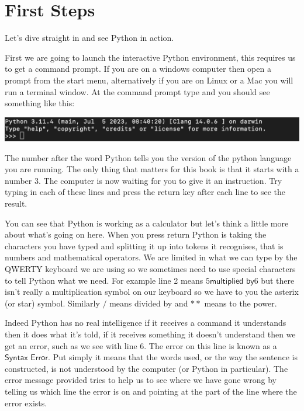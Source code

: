 \section{First Steps} \label{sec:FirstSteps}

Let's dive straight in and see Python in action. 

First we are going to launch the interactive Python environment, this requires us to get a command prompt. If you are on a windows computer then open a prompt from the start menu, alternatively if you are on Linux or a Mac you will run a terminal window. At the command prompt type  and you should see something like this:

\begin{center}
    \includegraphics[width=1\linewidth]{images/screenshots/PythonEnv.png}
\end{center}

The number after the word Python tells you the version of the python language you are running. The only thing that matters for this book is that it starts with a number 3. The computer is now waiting for you to give it an instruction.  Try typing in each of these lines and press the return key after each line to see the result.

\begin{minipage}{\textwidth}

\end{minipage}


You can see that Python is working as a calculator but let's think a little more about what's going on here. When you press return Python is taking the characters you have typed and splitting it up into tokens it recognises, that is numbers and mathematical operators. We are limited in what we can type by the QWERTY keyboard we are using so we sometimes need to use special characters to tell Python what we need. For example line 2 means $5 \textsf{multiplied by} 6$ but there isn't really a multiplication symbol on our keyboard so we have to you the asterix (or star) symbol. Similarly $/$ means divided by and $**$ means to the power. 

Indeed Python has no real intelligence if it receives a command it understands then it does what it's told, if it receives something it doesn't understand then we get an error, such as we see with line 6. The error on this line is known as a $\textsf{Syntax Error}$. Put simply it means that the words used, or the way the sentence is constructed, is not understood by the computer (or Python in particular).  The error message provided tries to help us to see where we have gone wrong by telling us which line the error is on and pointing at the part of the line where the error exists.

